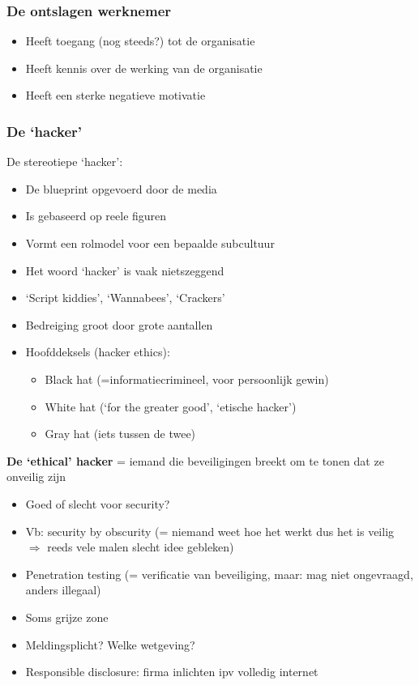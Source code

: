 \documentclass{article}
\newcommand{\bold}[1]{\textbf{#1}}
\begin{document}
\subsubsection{De ontslagen werknemer}
\begin{itemize}
    \item Heeft toegang (nog steeds?) tot de organisatie
    \item Heeft kennis over de werking van de organisatie
    \item Heeft een sterke negatieve motivatie
\end{itemize}

\subsubsection{De `hacker'}
De stereotiepe `hacker':
\begin{itemize}
    \item De blueprint opgevoerd door de media
    \item Is gebaseerd op reele figuren
    \item Vormt een rolmodel voor een bepaalde subcultuur
    \item Het woord `hacker' is vaak nietszeggend
    \item `Script kiddies', `Wannabees', `Crackers'
    \item Bedreiging groot door grote aantallen
    \item Hoofddeksels (hacker ethics):
    \begin{itemize}
        \item Black hat (=informatiecrimineel, voor persoonlijk gewin)
        \item White hat (`for the greater good', `etische hacker')
        \item Gray hat (iets tussen de twee)
    \end{itemize}
\end{itemize}

\bold{De `ethical' hacker}
= iemand die beveiligingen breekt om te tonen dat ze onveilig zijn

\begin{itemize}
    \item Goed of slecht voor security?
    \item Vb: security by obscurity (= niemand weet hoe het werkt dus het is veilig $\Rightarrow$ reeds vele malen slecht idee gebleken)
    \item Penetration testing (= verificatie van beveiliging, maar: mag niet ongevraagd, anders illegaal)
    \item Soms grijze zone
    \item Meldingsplicht? Welke wetgeving? 
    \item Responsible disclosure: firma inlichten ipv volledig internet
\end{itemize}
\end{document}
